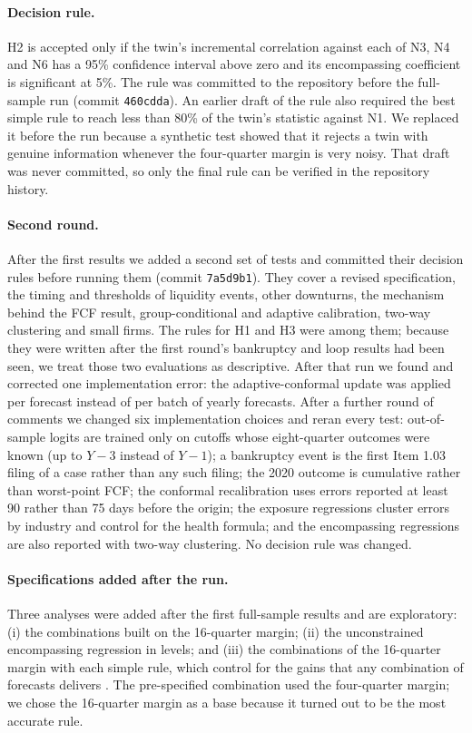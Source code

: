 \documentclass[11pt]{article}
\begin{document}
\paragraph{Decision rule.} H2 is accepted only if the twin's incremental correlation against each of N3, N4 and N6 has a 95\% confidence interval above zero and its encompassing coefficient is significant at 5\%. The rule was committed to the repository before the full-sample run (commit \texttt{460cdda}). An earlier draft of the rule also required the best simple rule to reach less than 80\% of the twin's statistic against N1. We replaced it before the run because a synthetic test showed that it rejects a twin with genuine information whenever the four-quarter margin is very noisy. That draft was never committed, so only the final rule can be verified in the repository history.

\paragraph{Second round.} After the first results we added a second set of tests and committed their decision rules before running them (commit \texttt{7a5d9b1}). They cover a revised specification, the timing and thresholds of liquidity events, other downturns, the mechanism behind the FCF result, group-conditional and adaptive calibration, two-way clustering and small firms. The rules for H1 and H3 were among them; because they were written after the first round's bankruptcy and loop results had been seen, we treat those two evaluations as descriptive. After that run we found and corrected one implementation error: the adaptive-conformal update was applied per forecast instead of per batch of yearly forecasts. After a further round of comments we changed six implementation choices and reran every test: out-of-sample logits are trained only on cutoffs whose eight-quarter outcomes were known (up to $Y-3$ instead of $Y-1$); a bankruptcy event is the first Item 1.03 filing of a case rather than any such filing; the 2020 outcome is cumulative rather than worst-point FCF; the conformal recalibration uses errors reported at least 90 rather than 75 days before the origin; the exposure regressions cluster errors by industry and control for the health formula; and the encompassing regressions are also reported with two-way clustering. No decision rule was changed.

\paragraph{Specifications added after the run.} Three analyses were added after the first full-sample results and are exploratory: (i) the combinations built on the 16-quarter margin; (ii) the unconstrained encompassing regression in levels; and (iii) the combinations of the 16-quarter margin with each simple rule, which control for the gains that any combination of forecasts delivers \citep{bates1969,clemen1989,timmermann2006}. The pre-specified combination used the four-quarter margin; we chose the 16-quarter margin as a base because it turned out to be the most accurate rule.
\end{document}
